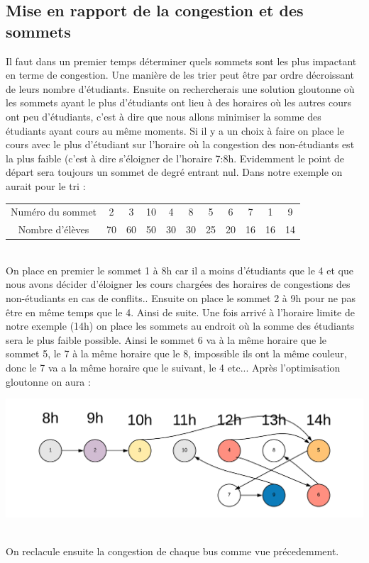 \documentclass[a4paper,11pt]{article}
\begin{document}
	\subsection{Mise en rapport de la congestion et des sommets}
		Il faut dans un premier temps déterminer quels sommets sont les plus impactant en terme de congestion. Une manière de les trier peut être par ordre décroissant de leurs nombre d'étudiants. Ensuite on rechercherais une solution gloutonne où les sommets ayant le plus d'étudiants ont lieu à des horaires où les autres cours ont peu d'étudiants, c'est à dire que nous allons minimiser la somme des étudiants ayant cours au même moments. Si il y a un choix à faire on place le cours avec le plus d'étudiant sur l'horaire où la congestion des non-étudiants est la plus faible (c'est à dire s'éloigner de l'horaire 7:8h. Evidemment le point de départ sera toujours un sommet de degré entrant nul. Dans notre exemple on aurait pour le tri : \\
		\begin{tabular}{ | c | c | c | c | c | c | c | c | c | c | c |}
 			\hline			
   			Numéro du sommet & 2 & 3 & 10 & 4 & 8 & 5 & 6 & 7 & 1 & 9\\
   			Nombre d'élèves & 70 & 60 & 50 & 30 & 30 & 25 & 20 & 16 & 16 & 14\\
 			\hline  
 		\end{tabular}\\	
 		On place en premier le sommet 1 à 8h car il a moins d'étudiants que le 4 et que nous avons décider d'éloigner les cours chargées des horaires de congestions des non-étudiants en cas de conflits.. Ensuite on place le sommet 2 à 9h pour ne pas être en même temps que le 4. Ainsi de suite. Une fois arrivé à l'horaire limite de notre exemple (14h) on place les sommets au endroit où la somme des étudiants sera le plus faible possible. Ainsi le sommet 6 va à la même horaire que le sommet 5, le 7 à la même horaire que le 8, impossible ils ont la même couleur, donc le 7 va a la même horaire que le suivant, le 4 etc...
 		Après l'optimisation gloutonne on aura : \\
 		\centerline{\includegraphics[scale=0.8]{Captures/exemple5.png}}\\
 		On reclacule ensuite la congestion de chaque bus comme vue précedemment.
\end{document}
